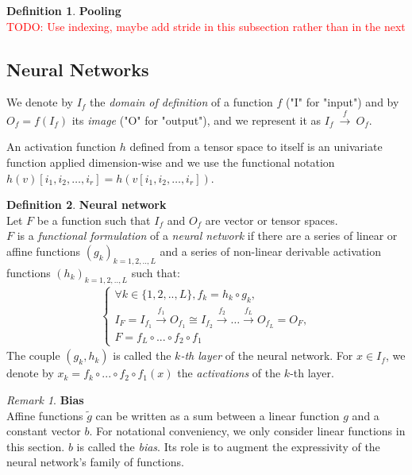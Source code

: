 \documentclass{article}
\theoremstyle{definition}
\newtheorem{definition}{Definition}[section]
\theoremstyle{remark}
\newtheorem{remark}{Remark}
\theoremstyle{plain}
\newcommand{\ovec}{}
\newcommand{\todo}[1]{\textcolor{red}{TODO: #1\\}}
\begin{document}
\begin{definition}\textbf{Pooling}\\

\todo{Use indexing, maybe add stride in this subsection rather than in the next}

\end{definition}

\subsection{Neural Networks}

We denote by $I_f$ the \textit{domain of definition} of a function $f$ ("I" for "input") and by $O_f = f(I_f)$ its \textit{image} ("O" for "output"), and we represent it as $I_f~\xrightarrow{f}~O_f$.

An activation function $h$ defined from a tensor space to itself is an univariate function applied dimension-wise and we use the functional notation $h(v)[i_1, i_2, \ldots, i_r] = h(v[i_1, i_2, \ldots, i_r])$.

\begin{definition}\textbf{Neural network}\\
\label{nndef}
{Let $F$ be a function such that $I_f$ and $O_f$ are vector or tensor spaces.\\
$F$ is a \emph{functional formulation} of a \emph{neural network} if there are a series of linear or affine functions $(g_k)_{k=1,2,..,L}$ and a series of non-linear derivable activation functions $(h_k)_{k=1,2,..,L}$ such that:
\begin{gather*}
\left\{
  \begin{array}{l}
    \forall k \in \{1,2,..,L\}, f_k = h_k \circ g_k, \\
    I_F = I_{f_1} \xrightarrow{f_1} O_{f_1} \cong I_{f_2} \xrightarrow{f_2} \dots \xrightarrow{f_L} O_{f_L} = O_F, \\
    F = f_{L} \circ ... \circ f_{2} \circ f_1
  \end{array}
\right.
\end{gather*}
The couple $(g_k, h_k)$ is called the \emph{$k$-th layer} of the neural network.
For $\ovec{x} \in I_f$, we denote by $\ovec{x_k} = f_k \circ ... \circ f_{2} \circ f_1 (\ovec{x})$ the \emph{activations} of the $k$-th layer.
}
\end{definition}

\begin{remark}\textbf{Bias}\\
Affine functions $\widetilde{g}$ can be written as a sum between a linear function $g$ and a constant vector $b$. For notational conveniency, we only consider linear functions in this section. $b$ is called the \emph{bias}. Its role is to augment the expressivity of the neural network's family of functions.
\end{remark}
\end{document}
